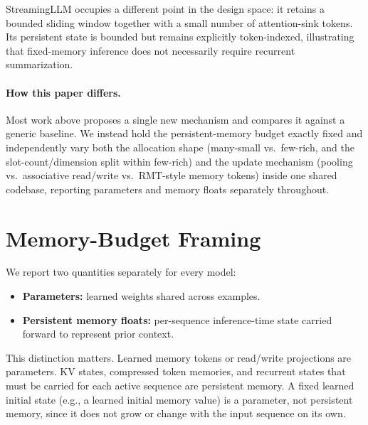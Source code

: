\documentclass[10pt]{article} %
\begin{document}
StreamingLLM \citep{xiao2023streaming} occupies a different point in the
design space: it retains a bounded sliding window together with a small
number of attention-sink tokens. Its persistent state is bounded but
remains explicitly token-indexed, illustrating that fixed-memory inference
does not necessarily require recurrent summarization.

\paragraph{How this paper differs.}
Most work above proposes a single new mechanism and compares it against a
generic baseline. We instead hold the persistent-memory budget exactly
fixed and independently vary both the allocation shape (many-small vs.\
few-rich, and the slot-count/dimension split within few-rich) and the
update mechanism (pooling vs.\ associative read/write vs.\ RMT-style memory
tokens) inside one shared codebase, reporting parameters and memory floats
separately throughout.

\section{Memory-Budget Framing}
\label{sec:memory-budget}

We report two quantities separately for every model:

\begin{itemize}[leftmargin=*]
  \item \textbf{Parameters:} learned weights shared across examples.
  \item \textbf{Persistent memory floats:} per-sequence inference-time state
  carried forward to represent prior context.
\end{itemize}

This distinction matters. Learned memory tokens or read/write projections
are parameters. KV states, compressed token memories, and recurrent states
that must be carried for each active sequence are persistent memory. A
fixed learned initial state (e.g., a learned initial memory value) is a
parameter, not persistent memory, since it does not grow or change with the
input sequence on its own.
\end{document}
